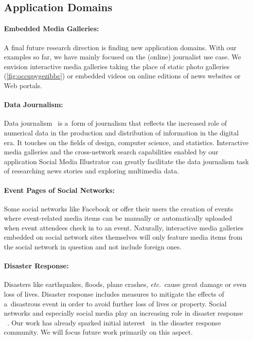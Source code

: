 \subsection{Application Domains}

\paragraph{Embedded Media Galleries:}

A final future research direction is finding new application domains.
With our examples so far, we have mainly focused
on the (online) journalist use case.
We envision interactive media galleries taking the place
of static photo galleries (\autoref{fig:occupygezibbc})
or embedded videos on online editions
of news websites or Web portals.

\paragraph{Data Journalism:}

Data journalism~\cite{rogers2011datajournalism,gray2012data}
is a~form of journalism that reflects the increased role
of numerical data in the production and distribution of information
in the digital era.
It touches on the fields of design, computer science, and statistics.
Interactive media galleries and the cross-network search capabilities enabled by our application Social Media Illustrator
can greatly facilitate the data journalism task of researching news stories and exploring multimedia data.

\paragraph{Event Pages of Social Networks:}

Some social networks like Facebook or \googleplus
offer their users the creation of events where
event-related media items can be manually or automatically
uploaded when event attendees check in to an event.
Naturally, interactive media galleries embedded on
social network sites themselves will only feature media items
from the social network in question and not include foreign ones.

\paragraph{Disaster Response:}

Disasters like earthquakes, floods, plane crashes, \emph{etc.}\ cause
great damage or even loss of lives.
Disaster response includes measures to
mitigate the effects of a~disastrous event
in order to avoid further loss of lives or property.
Social networks and especially social media
play an increasing role in disaster response%
~\cite{shklovski2008disasterresponse,sutton2008backchannels}.
Our work has already sparked initial interest~\cite{meier2013wikipedia}
in the disaster response community.
We will focus future work primarily on this aspect.

